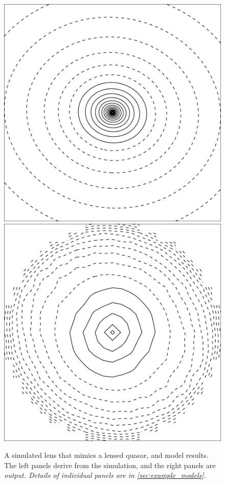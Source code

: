 \begin{figure}
  \includegraphics[width=\myplotswidth]{fig/ASW000102p_006941_kappa}
  \includegraphics[width=\myplotswidth]{fig/006941_mass}
  \caption[result 6941 (ASW000102p)]{A simulated lens that mimics a
    lensed quasar, and model results.  The left panels derive from the
    simulation, and the right panels are \sl output.  Details of
    individual panels are in \ref{sec:example_models}.}

  \label{fig:6941}
\end{figure}

